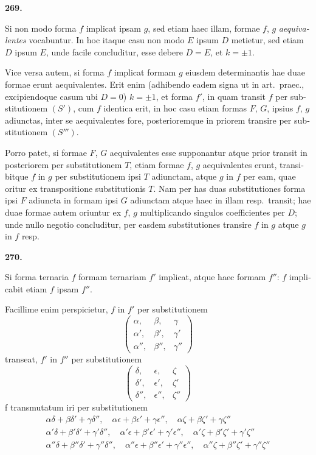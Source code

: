 \documentclass[12pt,a4paper]{article}
\theoremstyle{plain}
\theoremstyle{definition}
\theoremstyle{remark}
\begin{document}
\begin{otherlanguage}{latin}
\bigskip

\textbf{269.}

Si non modo forma $f$ implicat ipsam $g$, sed etiam haec illam, formae $f$, $g$ \emph{aequivalentes} vocabuntur. In hoc itaque casu non modo $E$ ipsum $D$ metietur, sed etiam $D$ ipsum $E$, unde facile concluditur, esse debere $D = E$, et $k = \pm 1$.

Vice versa autem, si forma $f$ implicat formam $g$ eiusdem determinantis hae duae formae erunt aequivalentes. Erit enim (adhibendo eadem signa ut in art.\ praec., excipiendoque casum ubi $D = 0$) $k = \pm 1$, et forma $f'$, in quam transit $f$ per substitutionem $(S')$, cum $f$ identica erit, in hoc casu etiam formas $F$, $G$, ipsius $f$, $g$ adiunctas, inter se aequivalentes fore, posterioremque in priorem transire per substitutionem $(S''')$.

Porro patet, si formae $F$, $G$ aequivalentes esse supponantur atque prior transit in posteriorem per substitutionem $T$, etiam formae $f$, $g$ aequivalentes erunt, transibitque $f$ in $g$ per substitutionem ipsi $T$ adiunctam, atque $g$ in $f$ per eam, quae oritur ex transpositione substitutionis $T$. Nam per has duas substitutiones forma ipsi $F$ adiuncta in formam ipsi $G$ adiunctam atque haec in illam resp.\ transit; hae duae formae autem oriuntur ex $f$, $g$ multiplicando singulos coefficientes per $D$; unde nullo negotio concluditur, per easdem substitutiones transire $f$ in $g$ atque $g$ in $f$ resp.

\bigskip

\textbf{270.}

Si forma ternaria $f$ formam ternariam $f'$ implicat, atque haec formam $f''$: $f$ implicabit etiam $f$ ipsam $f''$.

Facillime enim perspicietur, $f$ in $f'$ per substitutionem
\[
\begin{pmatrix} \alpha, & \beta, & \gamma \\ \alpha', & \beta', & \gamma' \\ \alpha'', & \beta'', & \gamma'' \end{pmatrix}
\]
transeat, $f'$ in $f''$ per substitutionem
\[
\begin{pmatrix} \delta, & \epsilon, & \zeta \\ \delta', & \epsilon', & \zeta' \\ \delta'', & \epsilon'', & \zeta'' \end{pmatrix}
\]
f transmutatum iri per substitutionem
\begin{gather*}
\alpha\delta + \beta\delta' + \gamma\delta'', \quad \alpha\epsilon + \beta\epsilon' + \gamma\epsilon'', \quad \alpha\zeta + \beta\zeta' + \gamma\zeta''\\
\alpha'\delta + \beta'\delta' + \gamma'\delta'', \quad \alpha'\epsilon + \beta'\epsilon' + \gamma'\epsilon'', \quad \alpha'\zeta + \beta'\zeta' + \gamma'\zeta''\\
\alpha''\delta + \beta''\delta' + \gamma''\delta'', \quad \alpha''\epsilon + \beta''\epsilon' + \gamma''\epsilon'', \quad \alpha''\zeta + \beta''\zeta' + \gamma''\zeta''
\end{gather*}


\end{otherlanguage}
\end{document}
